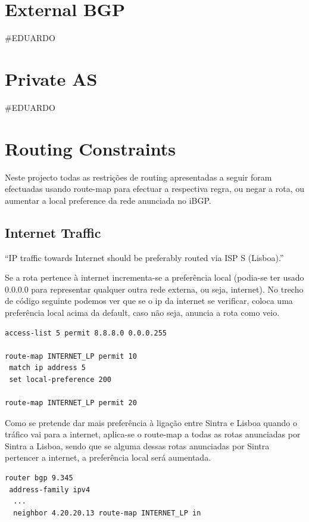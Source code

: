\documentclass[11pt,a4paper]{report}
\begin{document}
\section{External BGP}
\#EDUARDO
\section{Private AS}
\#EDUARDO

\section{Routing Constraints}

Neste projecto todas as restrições de routing apresentadas a seguir foram efectuadas usando route-map para efectuar a respectiva regra, ou negar a rota, ou aumentar a local preference da rede anunciada no iBGP.

\subsection{Internet Traffic}

``IP traffic towards Internet should be preferably routed via ISP S (Lisboa).''
\newline

Se a rota pertence à internet incrementa-se a preferência local (podia-se ter usado 0.0.0.0 para representar qualquer outra rede externa, ou seja, internet). No trecho de código seguinte podemos ver que se o ip da internet se verificar, coloca uma preferência local acima da default, caso não seja, anuncia a rota como veio.

\begin{lstlisting}[caption=Route-map para a Internet]
access-list 5 permit 8.8.8.0 0.0.0.255

route-map INTERNET_LP permit 10
 match ip address 5
 set local-preference 200

route-map INTERNET_LP permit 20
\end{lstlisting}

Como se pretende dar mais preferência à ligação entre Sintra e Lisboa quando o tráfico vai para a internet, aplica-se o route-map a todas as rotas anunciadas por Sintra a Lisboa, sendo que se alguma dessas rotas anunciadas por Sintra pertencer a internet, a preferência local será aumentada.\\

\begin{lstlisting}[caption=Route-map da Internet no Neighbor Sintra no Router de Lisboa]
router bgp 9.345
 address-family ipv4
  ...
  neighbor 4.20.20.13 route-map INTERNET_LP in
\end{lstlisting}
\end{document}

